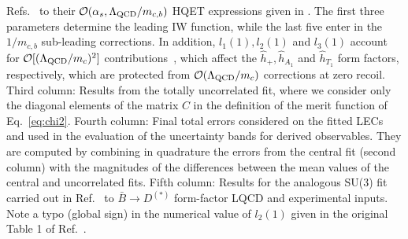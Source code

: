 \documentclass[aps,superscriptaddress,showpacs,nofootinbib,11pt]{revtex4-1}
\begin{document}
\begin{table}[t]
\begin{center}
{    Refs.~\cite{McLean:2019qcx,Harrison:2023dzh} to their ${\cal O}(\alpha_s,
\Lambda_{\rm QCD}/m_{c,b})$ HQET expressions given in \cite{Bernlochner:2017jka}. The first three parameters determine the leading IW function, while the last five enter in the $1/m_{c,b}$ sub-leading corrections. In addition, $l_1(1),l_2(1)$ and $l_3(1)$ account for ${\cal O}[(\Lambda_{\rm QCD}/m_c)^2]$ contributions~\cite{Jung:2018lfu}, which affect the $\hat h_+, \hat h_{A_1}$ and 
$\hat h_{T_1}$ form factors, respectively,  which are protected from
${\cal O}(\Lambda_{\rm QCD}/m_c)$ corrections at zero recoil. Third column: Results from the totally uncorrelated fit, where we consider only the diagonal elements of the matrix $C$ in the definition of the merit function of Eq.~\eqref{eq:chi2}. Fourth column: Final total errors considered on the fitted LECs and used in the evaluation of the uncertainty bands for derived observables. They are computed by combining in quadrature  the errors from the central fit (second column) with the magnitudes of the differences between the mean values of the central and uncorrelated fits. Fifth column: Results for the analogous SU(3) fit carried out in Ref.~\cite{Murgui:2019czp} to $\bar B \to D^{(*)}$ form-factor LQCD and experimental inputs. Note a typo (global sign) in the numerical value of $l_2(1)$ given in the original Table 1 of Ref.~\cite{Murgui:2019czp}. }
   \label{tab:hqssfit}
   \end{center}
\end{table}
%
\end{document}
